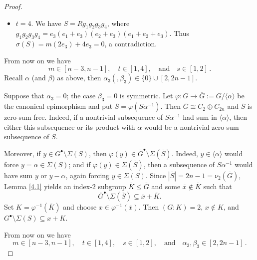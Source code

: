 \documentclass[a4paper, 10pt]{amsart}
\theoremstyle{plain}
\theoremstyle{definition}
\numberwithin{equation}{section}
\begin{document}
{\begin{proof}
\begin{itemize}
\item[(ii)] $t=4$. We have $S=Rg_1g_2g_3g_4$, where
$g_1g_2g_3g_4=e_3(e_1+e_3)(e_2+e_3)(e_1+e_2+e_3)$. Thus $\sigma(S)=m(2e_3)+4e_3=0$, a contradiction.
\end{itemize}


 
 
\smallskip
From now on we have 
\begin{equation}
m\in[n-3,n-1], \quad t \in [1, 4], \quad \text{and} \quad s \in [1, 2] \,. 
\end{equation}
Recall $ \alpha$  (and $\beta)$ as above, then $\alpha_3(, \beta_3) \in \{0\}\cup [2, 2n-1]$.

	
\smallskip
Suppose that $\alpha_3=0$; the case $\beta_3=0$ is symmetric. Let $\varphi \colon G\to \overline G:= G/\langle\alpha\rangle$ be the canonical epimorphism and put $\overline S=\varphi(S\alpha^{-1})$. Then $\overline G\cong C_2\oplus C_{2n}$ and $\overline S$ is zero-sum free. Indeed, if a nontrivial subsequence of $S\alpha^{-1}$ had sum in $\langle\alpha\rangle$, then either this subsequence or its product with $\alpha$ would be a nontrivial zero-sum subsequence of $S$.

Moreover, if $y\in G^{\bullet}\setminus\Sigma(S)$, then $\varphi(y)\in\overline G^{\bullet}\setminus\Sigma(\overline S)$. Indeed, $y\in\langle\alpha\rangle$ would force $y=\alpha\in\Sigma(S)$; and if $\varphi(y)\in\Sigma(\overline S)$, then a subsequence of $S\alpha^{-1}$ would have sum $y$ or $y-\alpha$, again forcing $y\in\Sigma(S)$. Since $|\overline S|=2n-1=\nu_2(\overline G)$, Lemma \ref{4.1} yields an index-$2$ subgroup $\overline K\le\overline G$ and some $\overline x\notin\overline K$ such that
\[
\overline G^{\bullet}\setminus\Sigma(\overline S)\subseteq\overline x+\overline K.
\]
Set $K=\varphi^{-1}(\overline K)$ and choose $x\in\varphi^{-1}(\overline x)$. Then $(G:K)=2$, $x\notin K$, and $G^{\bullet}\setminus\Sigma(S)\subseteq x+K$.



	

\smallskip
From now on we have 
\begin{equation}
m\in[n-3,n-1], \quad t \in [1, 4], \quad s \in [1, 2] , \quad \text{and} \quad  \alpha_3, \beta_3 \in [2,2n-1] \,. 
\end{equation}



\end{proof}}
\end{document}
